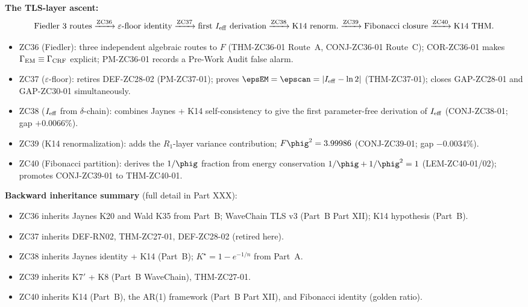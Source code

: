 \documentclass[12pt, a4paper]{article}
\begin{document}
\textbf{The TLS-layer ascent:}
\[
\text{Fiedler 3 routes} \xrightarrow{\text{ZC36}}
\text{$\varepsilon$-floor identity} \xrightarrow{\text{ZC37}}
\text{first $I_{\rm eff}$ derivation} \xrightarrow{\text{ZC38}}
\text{K14 renorm.} \xrightarrow{\text{ZC39}}
\text{Fibonacci closure} \xrightarrow{\text{ZC40}}
\text{K14 THM}.
\]

\begin{itemize}[noitemsep,leftmargin=1.5em]
  \item ZC36 (Fiedler): three independent algebraic routes to $F$
    (THM-ZC36-01 Route~A, CONJ-ZC36-01 Route~C); COR-ZC36-01 makes
    $\Gamma_{\rm EM}\equiv\Gamma_{\rm CRF}$ explicit; PM-ZC36-01
    records a Pre-Work Audit false alarm.
  \item ZC37 ($\varepsilon$-floor): retires DEF-ZC28-02 (PM-ZC37-01);
    proves $\epsEM = \epscan = |I_{\rm eff} - \ln 2|$
    (THM-ZC37-01); closes GAP-ZC28-01 and GAP-ZC30-01 simultaneously.
  \item ZC38 ($I_{\rm eff}$ from $\delta$-chain): combines Jaynes + K14
    self-consistency to give the first parameter-free derivation
    of $I_{\rm eff}$ (CONJ-ZC38-01; gap $+0.0066\%$).
  \item ZC39 (K14 renormalization): adds the $R_1$-layer variance
    contribution; $F\phig^2 = 3.99986$ (CONJ-ZC39-01; gap $-0.0034\%$).
  \item ZC40 (Fibonacci partition): derives the $1/\phig$ fraction
    from energy conservation $1/\phig + 1/\phig^2 = 1$
    (LEM-ZC40-01/02); promotes CONJ-ZC39-01 to THM-ZC40-01.
\end{itemize}

\textbf{Backward inheritance summary} (full detail in Part XXX):
\begin{itemize}[noitemsep,leftmargin=1.5em]
  \item ZC36 inherits Jaynes K20 and Wald K35 from Part~B;
    WaveChain TLS v3 (Part~B Part XII); K14 hypothesis (Part~B).
  \item ZC37 inherits DEF-RN02, THM-ZC27-01, DEF-ZC28-02 (retired here).
  \item ZC38 inherits Jaynes identity + K14 (Part~B); $K^\star =
    1 - e^{-1/n}$ from Part~A.
  \item ZC39 inherits K7$'$ + K8 (Part~B WaveChain), THM-ZC27-01.
  \item ZC40 inherits K14 (Part~B), the AR(1) framework (Part~B
    Part XII), and Fibonacci identity (golden ratio).
\end{itemize}
\end{document}
